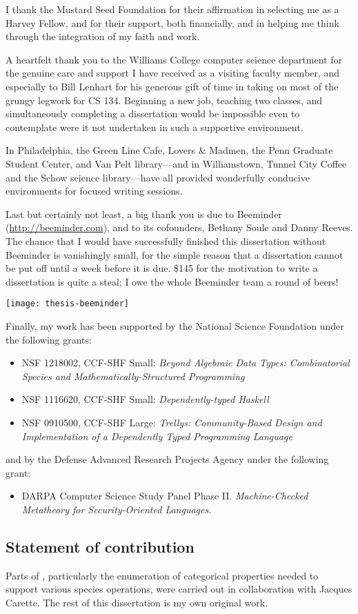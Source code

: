 I thank the Mustard Seed Foundation for their affirmation in selecting
me as a Harvey Fellow, and for their support, both financially, and in
helping me think through the integration of my faith and work.

A heartfelt thank you to the Williams College computer science
department for the genuine care and support I have received as a
visiting faculty member, and especially to Bill Lenhart for his
generous gift of time in taking on most of the grungy legwork for CS
134.  Beginning a new job, teaching two classes, and simultaneously
completing a dissertation would be impossible even to contemplate were
it not undertaken in such a supportive environment.

In Philadelphia, the Green Line Cafe, Lovers \& Madmen, the Penn
Graduate Student Center, and Van Pelt library---and in Williamstown,
Tunnel City Coffee and the Schow science library---have all provided
wonderfully conducive environments for focused writing sessions.

Last but certainly not least, a big thank you is due to Beeminder
(\url{http://beeminder.com}), and to its cofounders, Bethany Soule and
Danny Reeves.  The chance that I would have successfully finished this
dissertation without Beeminder is vanishingly small, for the simple
reason that a dissertation cannot be put off until a week before it is
due.  \$145 for the motivation to write a dissertation is quite a
steal; I owe the whole Beeminder team a round of beers!

\begin{center}
  \texttt{[image: thesis-beeminder]}
\end{center}

Finally, my work has been supported by the National Science
Foundation under the following grants:
\begin{itemize}
\item NSF 1218002, CCF-SHF Small: \emph{Beyond Algebraic Data Types:
  Combinatorial Species and Mathematically-Structured Programming}
\item NSF 1116620, CCF-SHF Small: \emph{Dependently-typed Haskell}
\item NSF 0910500, CCF-SHF Large: \emph{Trellys: Community-Based
    Design and Implementation of a Dependently Typed Programming
    Language}
\end{itemize}
and by the Defense Advanced Research Projects Agency under the
following grant:
\begin{itemize}
\item DARPA Computer Science Study Panel Phase
  II. \emph{Machine-Checked Metatheory for Security-Oriented
    Languages.}
\end{itemize}

\subsection*{Statement of contribution}

Parts of , particularly the enumeration of
categorical properties needed to support various species operations,
were carried out in collaboration with Jacques Carette.  The rest of
this dissertation is my own original work.
